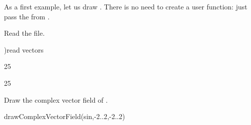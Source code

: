 As a first example, let us draw .
There is no need to create a user function: just pass the
 from .
\begin{xtc}
\begin{xtccomment}
Read the file.
\end{xtccomment}
\begin{spadsrc}
)read vectors 
\end{spadsrc}
\begin{TeXOutput}
\begin{fricasmath}{1}
%
\end{fricasmath}
\end{TeXOutput}
\begin{TeXOutput}
\begin{fricasmath}{2}
%
\end{fricasmath}
\end{TeXOutput}
\begin{TeXOutput}
\begin{fricasmath}{4}
%
\end{fricasmath}
\end{TeXOutput}
\begin{TeXOutput}
\begin{fricasmath}{6}
25%
\end{fricasmath}
\end{TeXOutput}
\begin{TeXOutput}
\begin{fricasmath}{7}
25%
\end{fricasmath}
\end{TeXOutput}
\begin{TeXOutput}
\begin{fricasmath}{8}
%
\end{fricasmath}
\end{TeXOutput}
\begin{TeXOutput}
\begin{fricasmath}{9}
%
\end{fricasmath}
\end{TeXOutput}
\end{xtc}
\begin{psXtc}
\begin{xtccomment}
Draw the complex vector field of .
\end{xtccomment}
\begin{spadsrc}
drawComplexVectorField(sin,-2..2,-2..2) 
\end{spadsrc}
\end{psXtc}
\

